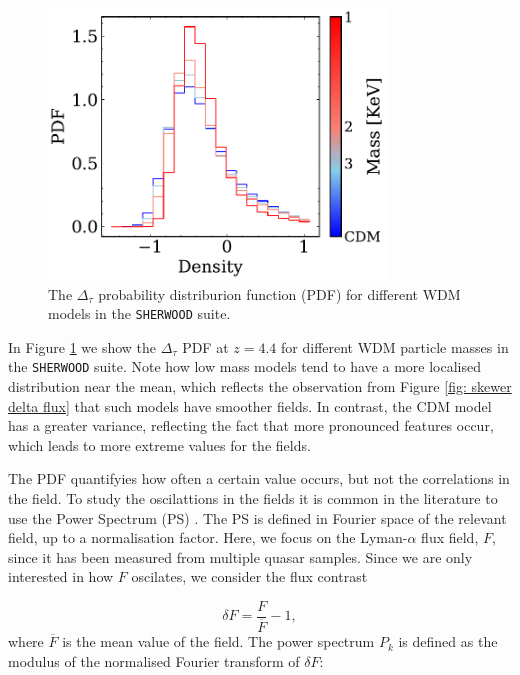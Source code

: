 \begin{figure}[ht]
        \centering
            \includegraphics[width=0.8\textwidth]{img/ML/pdf_density_sherwood.pdf}
            \caption{The $\Delta_\tau$ probability distriburion function (PDF) for different WDM models in the \texttt{SHERWOOD} suite.}
            \label{fig: exact density PDF}
\end{figure}


In Figure \ref{fig: exact density PDF} we show the $\Delta_\tau$ PDF at $z=4.4$ for different WDM particle masses in the \texttt{SHERWOOD} suite. Note how low mass models tend to have a more localised distribution near the mean, which reflects the observation from Figure \ref{fig: skewer delta flux} that such models have smoother fields. In contrast, the CDM model has a greater variance, reflecting the fact that more pronounced features occur, which leads to more extreme values for the fields. 

The PDF quantifyies how often a certain value occurs, but not the correlations in the field. To study the oscilattions in the fields it is common in the literature to use the Power Spectrum (PS) \cite{McDonald_2006,Ravoux_2023}. The PS is defined in Fourier space of the relevant field, up to a normalisation factor. Here, we focus on the Lyman-$\alpha$ flux field, $F$, since it has been measured from multiple quasar samples. Since we are only interested in how $F$ oscilates, we consider the flux contrast

\begin{equation}\label{eq: flux contrast}
        \delta F=\frac{F}{\overline{F}} -1,
\end{equation}
where $\overline{F}$ is the mean value of the field. The power spectrum $P_k$ is defined as the modulus of the normalised Fourier transform of $\delta F$:

